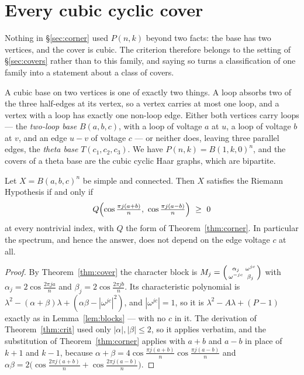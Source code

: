 \section{Every cubic cyclic cover}\label{sec:covram}

Nothing in \S\ref{sec:corner} used $P(n,k)$ beyond two facts: the base has two
vertices, and the cover is cubic. The criterion therefore belongs to the
setting of \S\ref{sec:covers} rather than to this family, and saying so turns
a classification of one family into a statement about a class of covers.

A cubic base on two vertices is one of exactly two things. A loop absorbs two
of the three half-edges at its vertex, so a vertex carries at most one loop,
and a vertex with a loop has exactly one non-loop edge. Either both vertices
carry loops --- the \emph{two-loop base} $B(a,b,c)$, with a loop of voltage $a$
at $u$, a loop of voltage $b$ at $v$, and an edge $u\!-\!v$ of voltage $c$ ---
or neither does, leaving three parallel edges, the \emph{theta base}
$T(c_1,c_2,c_3)$. We have $P(n,k)=B(1,k,0)^{n}$, and the covers of a theta base
are the cubic cyclic Haar graphs, which are bipartite.

\begin{theorem}\label{thm:covcorner}
Let $X=B(a,b,c)^{n}$ be simple and connected. Then $X$ satisfies the Riemann
Hypothesis if and only if
\[
  Q\Bigl(\cos\tfrac{\pi j(a+b)}{n},\ \cos\tfrac{\pi j(a-b)}{n}\Bigr)\ \ge\ 0
\]
at every nontrivial index, with $Q$ the form of Theorem~\ref{thm:corner}.
In particular the spectrum, and hence the answer, does not depend on the edge
voltage $c$ at all.
\end{theorem}

\begin{proof}
By Theorem~\ref{thm:cover} the character block is
$M_j=\begin{psmallmatrix}\alpha_j&\omega^{jc}\\ \omega^{-jc}&\beta_j\end{psmallmatrix}$
with $\alpha_j=2\cos\frac{2\pi ja}{n}$ and $\beta_j=2\cos\frac{2\pi jb}{n}$.
Its characteristic polynomial is $\lambda^{2}-(\alpha+\beta)\lambda+(\alpha\beta-|\omega^{jc}|^{2})$,
and $|\omega^{jc}|=1$, so it is $\lambda^{2}-A\lambda+(P-1)$ exactly as in
Lemma~\ref{lem:blocks} --- with no $c$ in it. The derivation of
Theorem~\ref{thm:crit} used only $|\alpha|,|\beta|\le2$, so it applies verbatim,
and the substitution of Theorem~\ref{thm:corner} applies with $a+b$ and $a-b$
in place of $k+1$ and $k-1$, because
$\alpha+\beta=4\cos\frac{\pi j(a+b)}{n}\cos\frac{\pi j(a-b)}{n}$ and
$\alpha\beta=2\bigl(\cos\frac{2\pi j(a+b)}{n}+\cos\frac{2\pi j(a-b)}{n}\bigr)$.
\end{proof}

